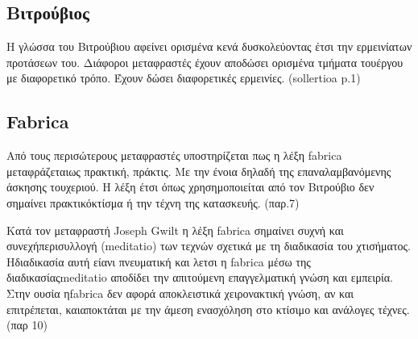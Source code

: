 





\subsection{Βιτρούβιος}




Η γλώσσα του Βιτρούβιου αφείνει ορισμένα κενά δυσκολεύοντας έτσι την ερμεινίατων προτάσεων του. Διάφοροι μεταφραστές έχουν αποδώσει ορισμένα τμήματα τουέργου με διαφορετικό τρόπο. Έχουν δώσει διαφορετικές ερμεινίες. (sollertioa p.1)

\subsection{Fabrica}

Από τους περισώτερους μεταφραστές υποστηρίζεται πως η λέξη fabrica μεταφράζεταιως πρακτική, πράκτις. Με την ένοια δηλαδή της επαναλαμβανόμενης άσκησης τουχεριού. Η λέξη έτσι όπως χρησημοποιείται από τον Βιτρούβιο δεν σημαίνει πρακτικόκτίσμα ή την τέχνη της κατασκευής. (παρ.7)

Κατά τον μεταφραστή Joseph Gwilt η λέξη fabrica σημαίνει συχνή και συνεχήπερισυλλογή (meditatio) των τεχνών σχετικά με τη διαδικασία του χτισήματος. Ηδιαδικασία αυτή είανι πνευματική και λετσι η fabrica μέσω της διαδικασίαςmeditatio αποδίδει την απιτούμενη επαγγελματική γνώση και εμπειρία. Στην ουσία ηfabrica δεν αφορά αποκλειστικά χειρονακτική γνώση, αν και επιτρέπεται, καιαποκτάται με την άμεση ενασχόληση στο κτίσιμο και ανάλογες τέχνες. (παρ 10)

